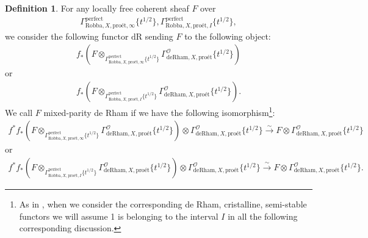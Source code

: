 \documentclass[12pt]{book}
\theoremstyle{definition}
\newtheorem{definition}{Definition}
\begin{document}
\begin{definition}
For any locally free coherent sheaf $F$ over
\begin{align}
\Gamma^\mathrm{perfect}_{\text{Robba},X,\text{pro\'et},\infty}\{t^{1/2}\},\Gamma^\mathrm{perfect}_{\text{Robba},X,\text{pro\'et},I}\{t^{1/2}\},
\end{align} 
we consider the following functor $\mathrm{dR}$ sending $F$ to the following object:
\begin{align}
f_*(F\otimes_{\Gamma^\mathrm{perfect}_{\text{Robba},X,\text{pro\'et},\infty}\{t^{1/2}\}} \Gamma^\mathcal{O}_{\text{deRham},X,\text{pro\'et}}\{t^{1/2}\})
\end{align}
or 
\begin{align}
f_*(F\otimes_{\Gamma^\mathrm{perfect}_{\text{Robba},X,\text{pro\'et},I}\{t^{1/2}\}} \Gamma^\mathcal{O}_{\text{deRham},X,\text{pro\'et}}\{t^{1/2}\}).
\end{align}
We call $F$ mixed-parity de Rham if we have the following isomorphism\footnote{As in \cite[Definition 10.10]{KL}, when we consider the corresponding de Rham, cristalline, semi-stable functors we will assume 1 is belonging to the interval $I$ in all the following corresponding discussion.}:
\begin{align}
f^*f_*(F\otimes_{\Gamma^\mathrm{perfect}_{\text{Robba},X,\text{pro\'et},\infty}\{t^{1/2}\}} \Gamma^\mathcal{O}_{\text{deRham},X,\text{pro\'et}}\{t^{1/2}\}) \otimes \Gamma^\mathcal{O}_{\text{deRham},X,\text{pro\'et}}\{t^{1/2}\} \overset{\sim}{\longrightarrow} F \otimes \Gamma^\mathcal{O}_{\text{deRham},X,\text{pro\'et}}\{t^{1/2}\} 
\end{align}
or 
\begin{align}
f^*f_*(F\otimes_{\Gamma^\mathrm{perfect}_{\text{Robba},X,\text{pro\'et},I}\{t^{1/2}\}} \Gamma^\mathcal{O}_{\text{deRham},X,\text{pro\'et}}\{t^{1/2}\}) \otimes \Gamma^\mathcal{O}_{\text{deRham},X,\text{pro\'et}}\{t^{1/2}\} \overset{\sim}{\longrightarrow} F \otimes \Gamma^\mathcal{O}_{\text{deRham},X,\text{pro\'et}}\{t^{1/2}\}. 
\end{align}
\end{definition}
\end{document}
